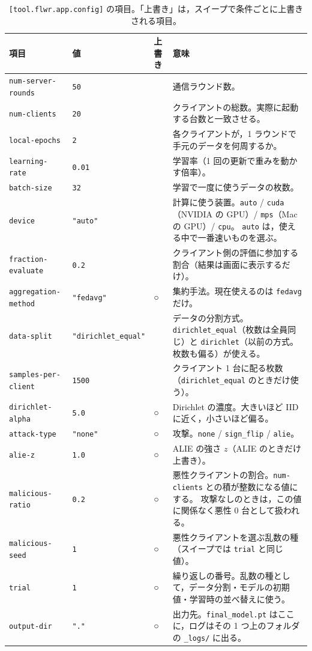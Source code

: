 \documentclass[a4j, dvipdfmx]{jsarticle}  %
\begin{document}
\begin{table}[H]
\centering
\caption{\texttt{[tool.flwr.app.config]} の項目。「上書き」は，スイープで条件ごとに上書きされる項目。}
\label{tab:config}
\small
\begin{tabular}{@{}P{3.5cm} P{2.0cm} P{1.2cm} P{8.2cm}@{}}
\toprule
項目 & 値 & 上書き & 意味 \\
\midrule
\texttt{num-server-rounds} & \texttt{50} & & 通信ラウンド数。 \\
\texttt{num-clients} & \texttt{20} & & クライアントの総数。実際に起動する台数と一致させる。 \\
\texttt{local-epochs} & \texttt{2} & & 各クライアントが，1 ラウンドで手元のデータを何周するか。 \\
\texttt{learning-rate} & \texttt{0.01} & & 学習率（1 回の更新で重みを動かす倍率）。 \\
\texttt{batch-size} & \texttt{32} & & 学習で一度に使うデータの枚数。 \\
\texttt{device} & \texttt{"auto"} & & 計算に使う装置。\texttt{auto} / \texttt{cuda}（NVIDIA の GPU）/ \texttt{mps}（Mac の GPU）/ \texttt{cpu}。
\texttt{auto} は，使える中で一番速いものを選ぶ。 \\
\texttt{fraction-evaluate} & \texttt{0.2} & & クライアント側の評価に参加する割合（結果は画面に表示するだけ）。 \\
\texttt{aggregation-method} & \texttt{"fedavg"} & ○ & 集約手法。現在使えるのは \texttt{fedavg} だけ。 \\
\texttt{data-split} & \texttt{"dirichlet\_equal"} & & データの分割方式。\texttt{dirichlet\_equal}（枚数は全員同じ）と \texttt{dirichlet}（以前の方式。枚数も偏る）が使える。 \\
\texttt{samples-per-client} & \texttt{1500} & & クライアント 1 台に配る枚数（\texttt{dirichlet\_equal} のときだけ使う）。 \\
\texttt{dirichlet-alpha} & \texttt{5.0} & ○ & Dirichlet の濃度。大きいほど IID に近く，小さいほど偏る。 \\
\texttt{attack-type} & \texttt{"none"} & ○ & 攻撃。\texttt{none} / \texttt{sign\_flip} / \texttt{alie}。 \\
\texttt{alie-z} & \texttt{1.0} & ○ & ALIE の強さ $z$（ALIE のときだけ上書き）。 \\
\texttt{malicious-ratio} & \texttt{0.2} & ○ & 悪性クライアントの割合。\texttt{num-clients} との積が整数になる値にする。
攻撃なしのときは，この値に関係なく悪性 0 台として扱われる。 \\
\texttt{malicious-seed} & \texttt{1} & ○ & 悪性クライアントを選ぶ乱数の種（スイープでは \texttt{trial} と同じ値）。 \\
\texttt{trial} & \texttt{1} & ○ & 繰り返しの番号。乱数の種として，データ分割・モデルの初期値・学習時の並べ替えに使う。 \\
\texttt{output-dir} & \texttt{"."} & ○ & 出力先。\texttt{final\_model.pt} はここに，ログはその 1 つ上のフォルダの \texttt{\_logs/} に出る。 \\
\bottomrule
\end{tabular}
\end{table}
\end{document}
